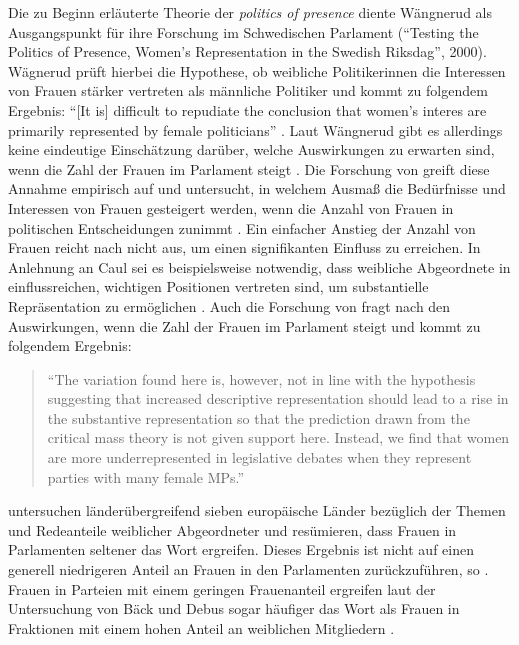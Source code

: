\documentclass[12pt, 
    twoside=false, 
    bibliography=totoc, 
    numbers=endperiod, 
    headings=normal, 
    toc=chapterentrydotfill
    ]{scrbook}
\begin{document}
%
Die zu Beginn erläuterte Theorie der \emph{politics of presence} \parencite{phillips_1998} diente Wängnerud \parencite*{wangnerud_2000} als Ausgangspunkt für ihre Forschung im Schwedischen Parlament (\enquote{Testing the Politics of Presence, Women's Representation in the Swedish Riksdag}, 2000). Wägnerud prüft hierbei die Hypothese, ob weibliche Politikerinnen die Interessen von Frauen stärker vertreten als männliche Politiker \parencite[84]{wangnerud_2000} und kommt zu folgendem Ergebnis: \enquote{[It is] difficult to repudiate the conclusion that women's interes are primarily represented by female politicians} \parencite[][84]{wangnerud_2000}. Laut Wängnerud \parencite*{wangnerud_2000} gibt es allerdings keine eindeutige Einschätzung darüber, welche Auswirkungen zu erwarten sind, wenn die Zahl der Frauen im Parlament steigt \parencite{wangnerud_2009}.
Die Forschung von \textcite{celis_2008} greift diese Annahme empirisch auf und untersucht, in welchem Ausmaß die Bedürfnisse und Interessen von Frauen gesteigert werden, wenn die Anzahl von Frauen in politischen Entscheidungen zunimmt \parencite[vgl. auch][4]{galligan_2016}. Ein einfacher Anstieg der Anzahl von Frauen reicht nach \textcite{celis_2008}  nicht aus, um einen signifikanten Einfluss zu erreichen. In Anlehnung an Caul \parencite*{caul_2001}  sei  es beispielsweise notwendig, dass weibliche Abgeordnete in einflussreichen, wichtigen Positionen vertreten sind, um substantielle Repräsentation zu ermöglichen \parencites{caul_2001}[vgl. auch][14]{coffe_2013}.
Auch die Forschung von \textcite{back_2014} fragt nach den Auswirkungen, wenn die Zahl der Frauen im Parlament steigt und kommt zu folgendem Ergebnis: 

\begin{quote}
  \enquote{The variation found here is, however, not in line with the hypothesis suggesting that
increased descriptive representation should lead to a rise in the substantive representation so that the prediction drawn from the critical mass theory is not given support here. Instead, we find that women are more underrepresented in legislative debates when they represent parties with many female MPs.}
  \parencite[17]{back_2018}
\end{quote}


\textcite{back_2018}  untersuchen länderübergreifend sieben europäische Länder bezüglich der Themen und Redeanteile weiblicher Abgeordneter und resümieren, dass Frauen in Parlamenten seltener das Wort ergreifen. Dieses Ergebnis ist nicht auf einen generell niedrigeren Anteil an Frauen in den Parlamenten zurückzuführen, so \textcite{back_2018}. Frauen in Parteien mit einem geringen Frauenanteil ergreifen laut der Untersuchung von Bäck und Debus sogar häufiger das Wort als Frauen in Fraktionen mit einem hohen Anteil an weiblichen Mitgliedern \parencite[17]{back_2018}. 
\end{document}
